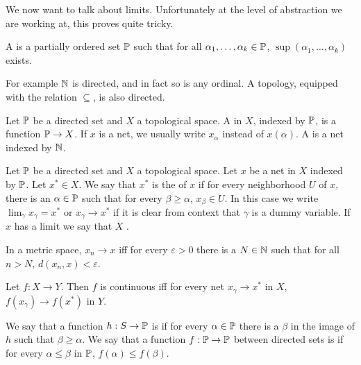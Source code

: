 \begin{subsec}
We now want to talk about limits. Unfortunately at the level of abstraction we are working at, this proves quite tricky.
\end{subsec}

\begin{definition}
A  is a partially ordered set $\mathbb{P}$ such that for all $\alpha_{1}, \dots, \alpha_{k} \in \mathbb{P}$, $\sup(\alpha_{1}, \dots, \alpha_{k})$ exists.
\end{definition}

\begin{subsec}
For example $\mathbb{N}$ is directed, and in fact so is any ordinal. A topology, equipped with the relation $\subseteq$, is also directed.
\end{subsec}

\begin{definition}
Let $\mathbb{P}$ be a directed set and $X$ a topological space.
A  in $X$, indexed by $\mathbb{P}$, is a function $\mathbb{P} \to X$. If $x$ is a net, we usually write $x_{\alpha}$ instead of $x(\alpha)$.
A  is a net indexed by $\mathbb{N}$.
\end{definition}

\begin{definition}
Let $\mathbb{P}$ be a directed set and $X$ a topological space. Let $x$ be a net in $X$ indexed by $\mathbb{P}$. Let $x^{*} \in X$.
We say that $x^{*}$ is the  of $x$ if for every neighborhood $U$ of $x$, there is an $\alpha \in \mathbb{P}$ such that for every $\beta \geq \alpha$, $x_{\beta} \in U$.
In this case we write $\lim_{\gamma} x_{\gamma} = x^{*}$ or $x_{\gamma} \to x^{*}$ if it is clear from context that $\gamma$ is a dummy variable.
If $x$ has a limit we say that $X$ .
\end{definition}

\begin{lemma}
In a metric space, $x_{n} \to x$ iff for every $\varepsilon > 0$ there is a $N \in \mathbb{N}$ such that for all $n > N$, $d(x_{n}, x) < \varepsilon$.
\end{lemma}

\begin{lemma}
Let $f: X \to Y$. Then $f$ is continuous iff for every net $x_{\gamma} \to x^{*}$ in $X$, $f(x_{\gamma}) \to f(x^{*})$ in $Y$.
\end{lemma}

\begin{definition}
We say that a function $h: S \to \mathbb{P}$ is  if for every $\alpha \in \mathbb{P}$ there is a $\beta$ in the image of $h$ such that $\beta \geq \alpha$.
We say that a function $f: \mathbb{P} \to \mathbb{P}$ between directed sets is  if for every $\alpha \leq \beta$ in $\mathbb{P}$, $f(\alpha) \leq f(\beta)$.
\end{definition}

